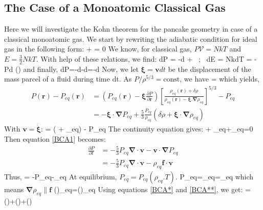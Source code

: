 \subsection{The Case of a Monoatomic Classical Gas}
Here we will investigate the Kohn theorem for the pancake geometry in case of a classical monoatomic gas. We start by rewriting the adiabatic condition for ideal gas in the following form:
\be
{} +   = 0 
\ee
We know, for classical gas, $P\mathcal{V} = NkT$ and $E=\frac{3}{2} NkT$. With help of these relations, we find:
\be
dP = -d +  \ ; \ dE = NkdT = -Pd ()
\ee
and finally,
\be
dP=-d-d=-d
\ee
Now, we let $\bm{\xi}=\bm{v}dt$ be the displacement of the mass parcel of a fluid during time dt. As $P/\rho^{5/3}=\textrm{const}$, we have
\be
{}=
\ee
which yields,
\begin{align}
P(\bm{r})-P_{eq}(\bm{r}) &= \left(P_{eq}(\bm{r})-\bm{\xi}\frac{\partial P}{\partial \bm{r}}\right) \left[\frac{\rho_{eq}(\bm{r})+\delta\rho}{\rho_{eq}(\bm{r})-\bm{\xi}.\bm{\nabla}\rho_{eq}}\right]^{5/3}-P_{eq} \\
&= -\bm{\xi}\cdot\bm{\nabla}P_{eq}+\frac{5}{3}\frac{P_{eq}}{\rho_{eq}}\left(\delta \rho+\bm{\xi}\cdot\bm{\nabla}\rho_{eq}\right)
\end{align}
With $\bm{v}=\dot{\bm{\xi}}$:
\be\label{BCA1}
 =  \left(\partial \delta {} + \cdot\bm{\nabla}\rho_{eq}\right) - \cdot\bm{\nabla} P_{eq}
\ee
The continuity equation gives:
\be
{} + \cdot\bm{\nabla}\rho_{eq}+\rho_{eq}\bm{\nabla}\cdot{}=0
\ee
Then equation \eqref{BCA1} becomes:
\begin{align}
\frac{\partial P}{\partial t} &= -\frac{5}{3}P_{eq}\bm{\nabla}\cdot\bm{v}-\bm{v}\cdot\bm{\nabla}P_{eq} \\
&= -\frac{5}{3}P_{eq}\bm{\nabla}\cdot\bm{v}-\rho_{eq}\bm{f}\cdot\bm{v}
\end{align}
Thus,
\be\label{BCA**}
 = -P_{eq}\bm{\nabla}\cdot{}-\rho_{eq}\cdot{}
\ee
At equilibrium, $P_{eq}=P_{eq}(\rho_{eq}.T)$.
\be
\bm{\nabla}P_{eq}=\bm{\nabla}\rho_{eq}=\rho_{eq}
\ee
which means $\bm{\nabla}\rho_{eq}\parallel\bm{f}$
\be
(\cdot{})\bm{\nabla}\rho_{eq}=(\cdot\bm{\nabla})\rho_{eq}
\ee
Using equations \eqref{BCA*} and \eqref{BCA**}, we get:
\be
{} = \bm{\nabla}(\bm{\nabla}\cdot{})+\bm{\nabla}(\cdot{})+(\bm{\nabla}\cdot{})
\ee


